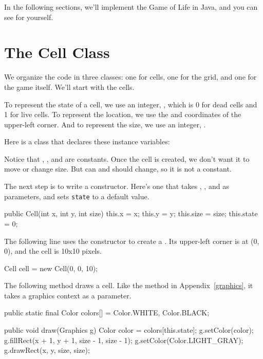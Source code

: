 In the following sections, we'll implement the Game of Life in Java, and you can see for yourself.


\section{The Cell Class}


We organize the code in three classes: one for cells, one for the grid, and one for the game itself.
We'll start with the cells.

To represent the state of a cell, we use an integer, , which is 0 for dead cells and 1 for live cells.
To represent the location, we use the  and  coordinates of the upper-left corner.
And to represent the size, we use an integer, .

Here is a  class that declares these instance variables:

\begin{code}
public class Cell {
    private final int x;
    private final int y;
    private final int size;
    private int state;
\end{code}

Notice that , , and  are constants.
Once the cell is created, we don't want it to move or change size.
But  can and should change, so it is not a constant.

The next step is to write a constructor.
Here's one that takes , , and  as parameters, and sets {\tt state} to a default value.

\begin{code}
    public Cell(int x, int y, int size) {
        this.x = x;
        this.y = y;
        this.size = size;
        this.state = 0;
    }
\end{code}

The following line uses the constructor to create a .
Its upper-left corner is at (0, 0), and the cell is 10x10 pixels.

\begin{code}
Cell cell = new Cell(0, 0, 10);
\end{code}

The following method draws a cell.
Like the  method in Appendix~\ref{graphics},
it takes a graphics context as a parameter.

\begin{code}
	public static final Color colors[] = {Color.WHITE, Color.BLACK};

    public void draw(Graphics g) {
        Color color = colors[this.state];
        g.setColor(color);
        g.fillRect(x + 1, y + 1, size - 1, size - 1);
        g.setColor(Color.LIGHT_GRAY);
        g.drawRect(x, y, size, size);
    }
\end{code}

